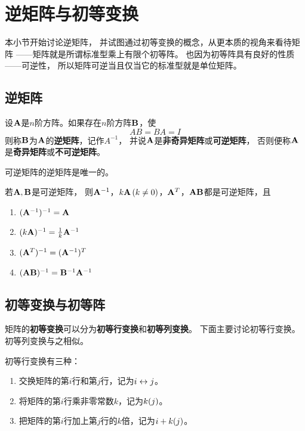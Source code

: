 \section{逆矩阵与初等变换}
本小节开始讨论逆矩阵，
并试图通过初等变换的概念，从更本质的视角来看待矩阵
——矩阵就是所谓标准型乘上有限个初等阵。
也因为初等阵具有良好的性质——可逆性，
所以矩阵可逆当且仅当它的标准型就是单位矩阵。

\subsection{逆矩阵}
\begin{definition}[逆矩阵]
  设$\mathbf{A}$是$n$阶方阵。如果存在$n$阶方阵$\mathbf{B}$，使
  \begin{equation}
    AB=BA=I
  \end{equation}
  则称$\mathbf{B}$为$\mathbf{A}$的\textbf{逆矩阵}，记作$A^{-1}$，
  并说$\mathbf{A}$是\textbf{非奇异矩阵}或\textbf{可逆矩阵}，
  否则便称$\mathbf{A}$是\textbf{奇异矩阵}或\textbf{不可逆矩阵}。
\end{definition}

\begin{theorem}[逆矩阵的唯一性]
  可逆矩阵的逆矩阵是唯一的。
\end{theorem}

\begin{theorem}[可逆矩阵的性质]
  若$\mathbf{A},\mathbf{B}$是可逆矩阵，
  则$\mathbf{A}^{-1}$，$k\mathbf{A}\,(k\neq 0)$，$\mathbf{A}^T$，$\mathbf{A}\mathbf{B}$都是可逆矩阵，且
  \begin{enumerate}
    \item $(\mathbf{A}^{-1})^{-1} = \mathbf{A}$
    \item $(k\mathbf{A})^{-1} = \frac{1}{k}\mathbf{A}^{-1}$
    \item $(\mathbf{A}^T)^{-1} = (\mathbf{A}^{-1})^T$
    \item $(\mathbf{A}\mathbf{B})^{-1} = \mathbf{B}^{-1}\mathbf{A}^{-1}$
  \end{enumerate}
\end{theorem}

\subsection{初等变换与初等阵}
矩阵的\textbf{初等变换}可以分为\textbf{初等行变换}和\textbf{初等列变换}。
下面主要讨论初等行变换。初等列变换与之相似。

\begin{definition}[初等行变换]
  初等行变换有三种：
  \begin{enumerate}
    \item 交换矩阵的第$i$行和第$j$行，记为$i \leftrightarrow j$。
    \item 将矩阵的第$i$行乘非零常数$k$，记为$k(j)$。
    \item 把矩阵的第$i$行加上第$j$行的$k$倍，记为$i +k (j)$。
  \end{enumerate}
\end{definition}

